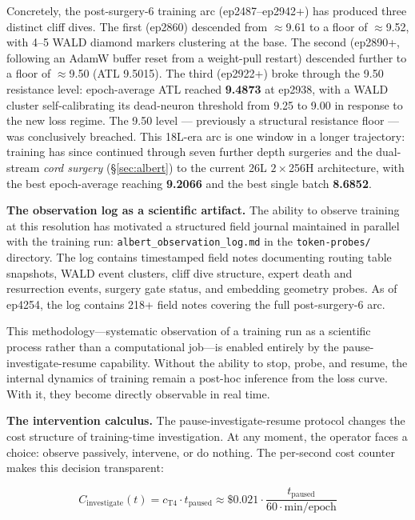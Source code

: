 \documentclass[11pt,a4paper]{article}
\begin{document}
Concretely, the post-surgery-6 training arc (ep2487--ep2942+) has produced three distinct
cliff dives. The first (ep2860) descended from $\approx$9.61 to a floor of
$\approx$9.52, with 4--5 WALD diamond markers clustering at the base. The second
(ep2890+, following an AdamW buffer reset from a weight-pull restart) descended further
to a floor of $\approx$9.50 (ATL 9.5015). The third (ep2922+) broke through the 9.50
resistance level: epoch-average ATL reached \textbf{9.4873} at ep2938, with a WALD cluster
self-calibrating its dead-neuron threshold from 9.25 to 9.00 in response to the new loss
regime. The 9.50 level --- previously a structural resistance floor --- was
conclusively breached. This 18L-era arc is one window in a longer trajectory: training
has since continued through seven further depth surgeries and the dual-stream
\emph{cord surgery} (\S\ref{sec:albert}) to the current 26L $2\times$256H architecture,
with the best epoch-average reaching \textbf{9.2066} and the best single batch
\textbf{8.6852}.

\textbf{The observation log as a scientific artifact.} The ability to observe training at
this resolution has motivated a structured field journal maintained in parallel with the
training run: \texttt{albert\_observation\_log.md} in the \texttt{token-probes/} directory.
The log contains timestamped field notes documenting routing table snapshots, WALD event
clusters, cliff dive structure, expert death and resurrection events, surgery gate status,
and embedding geometry probes. As of ep4254, the log contains 218+ field notes covering the
full post-surgery-6 arc.

This methodology---systematic observation of a training run as a scientific process rather
than a computational job---is enabled entirely by the pause-investigate-resume capability.
Without the ability to stop, probe, and resume, the internal dynamics of training remain
a post-hoc inference from the loss curve. With it, they become directly observable in real
time.

\textbf{The intervention calculus.} The pause-investigate-resume protocol changes the
cost structure of training-time investigation. At any moment, the operator faces a choice:
observe passively, intervene, or do nothing. The per-second cost counter makes this
decision transparent:

\begin{equation}
  C_{\text{investigate}}(t) = c_{\text{T4}} \cdot t_{\text{paused}}
  \approx \$0.021 \cdot \frac{t_{\text{paused}}}{60 \cdot \text{min/epoch}}
\end{equation}
\end{document}
